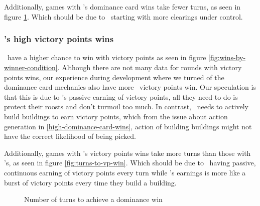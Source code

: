 Additionally, games with \Marquise's dominance card wins take fewer turns, as seen in figure \ref{fig:turns-to-dominance-win}. Which should be due to \Marquise \ starting with more clearings under control.

\subsubsection{\Eyrie's high victory points wins}
\Eyrie \ have a higher chance to win with victory points as seen in figure \ref{fig:wins-by-winner-condition}. Although there are not many data for rounds with victory points wins, our experience during development where we turned of the dominance card mechanics also have more \Eyrie \ victory points win. Our speculation is that this is due to \Eyrie's passive earning of victory points, all they need to do is protect their roosts and don't turmoil too much. In contrast, \Marquise \ needs to actively build buildings to earn victory points, which from the issue about action generation in \ref{high-dominance-card-wins}, action of building buildings might not have the correct likelihood of being picked.

Additionally, games with \Eyrie's victory points wins take more turns than those with \Marquise's, as seen in figure \ref{fig:turns-to-vp-win}. Which should be due to \Eyrie \ having passive, continuous earning of victory points every turn while \Marquise's earnings is more like a burst of victory points every time they build a building.



\begin{figure}
    \centering
    \caption{Number of turns to achieve a dominance win}
    \label{fig:turns-to-dominance-win}
\end{figure}

